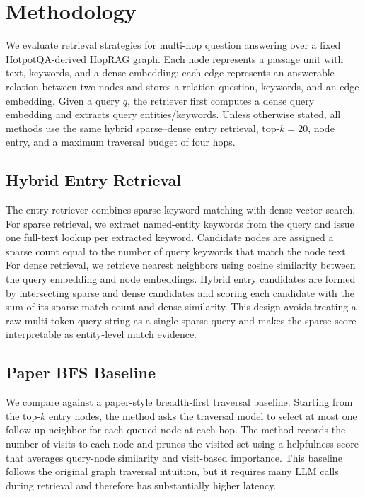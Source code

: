 \section{Methodology}
\label{sec:methodology}

We evaluate retrieval strategies for multi-hop question answering over a fixed
HotpotQA-derived HopRAG graph. Each node represents a passage unit with text,
keywords, and a dense embedding; each edge represents an answerable relation
between two nodes and stores a relation question, keywords, and an edge
embedding. Given a query $q$, the retriever first computes a dense query
embedding and extracts query entities/keywords. Unless otherwise stated, all
methods use the same hybrid sparse--dense entry retrieval, top-$k=20$, node
entry, and a maximum traversal budget of four hops.

\subsection{Hybrid Entry Retrieval}
\label{sec:method-entry-retrieval}

The entry retriever combines sparse keyword matching with dense vector search.
For sparse retrieval, we extract named-entity keywords from the query and issue
one full-text lookup per extracted keyword. Candidate nodes are assigned a
sparse count equal to the number of query keywords that match the node text. For
dense retrieval, we retrieve nearest neighbors using cosine similarity between
the query embedding and node embeddings. Hybrid entry candidates are formed by
intersecting sparse and dense candidates and scoring each candidate with the sum
of its sparse match count and dense similarity. This design avoids treating a
raw multi-token query string as a single sparse query and makes the sparse score
interpretable as entity-level match evidence.

\subsection{Paper BFS Baseline}
\label{sec:method-paper-bfs}

We compare against a paper-style breadth-first traversal baseline. Starting from
the top-$k$ entry nodes, the method asks the traversal model to select at most
one follow-up neighbor for each queued node at each hop. The method records the
number of visits to each node and prunes the visited set using a helpfulness
score that averages query-node similarity and visit-based importance. This
baseline follows the original graph traversal intuition, but it requires many
LLM calls during retrieval and therefore has substantially higher latency.

